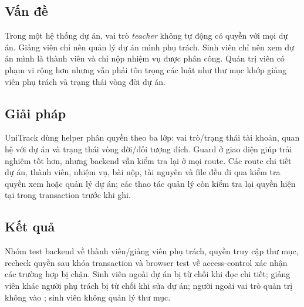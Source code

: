 \subsection{Vấn đề}

Trong một hệ thống dự án, vai trò \textit{teacher} không tự động có quyền với mọi dự án. Giảng viên chỉ nên quản lý dự án mình phụ trách. Sinh viên chỉ nên xem dự án mình là thành viên và chỉ nộp nhiệm vụ được phân công. Quản trị viên có phạm vi rộng hơn nhưng vẫn phải tôn trọng các luật như thư mục khớp giảng viên phụ trách và trạng thái vòng đời dự án.

\subsection{Giải pháp}

UniTrack dùng helper phân quyền theo ba lớp: vai trò/trạng thái tài khoản, quan hệ với dự án và trạng thái vòng đời/đối tượng đích. Guard ở giao diện giúp trải nghiệm tốt hơn, nhưng backend vẫn kiểm tra lại ở mọi route. Các route chi tiết dự án, thành viên, nhiệm vụ, bài nộp, tài nguyên và file đều đi qua kiểm tra quyền xem hoặc quản lý dự án; các thao tác quản lý còn kiểm tra lại quyền hiện tại trong transaction trước khi ghi.

\figAccessControlLayers

\subsection{Kết quả}

Nhóm test backend về thành viên/giảng viên phụ trách, quyền truy cập thư mục, recheck quyền sau khóa transaction và browser test về access-control xác nhận các trường hợp bị chặn. Sinh viên ngoài dự án bị từ chối khi đọc chi tiết; giảng viên khác người phụ trách bị từ chối khi sửa dự án; người ngoài vai trò quản trị không vào ; sinh viên không quản lý thư mục.

